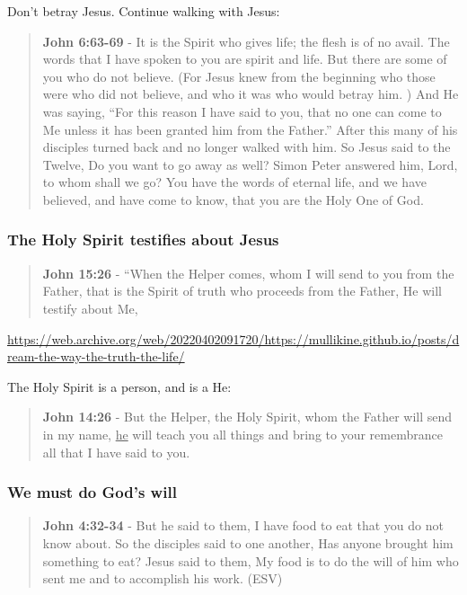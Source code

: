 \documentclass[11pt]{article}
\begin{document}
Don't betray Jesus. Continue walking with Jesus:

\begin{quote}
\textbf{John 6:63-69} - It is the Spirit who gives life; the flesh is of no avail. The words that I have spoken to you are spirit and life. But there are some of you who do not believe. (For Jesus knew from the beginning who those were who did not believe, and who it was who would betray him. ) And He was saying, “For this reason I have said to you, that no one can come to Me unless it has been granted him from the Father.” After this many of his disciples turned back and no longer walked with him. So Jesus said to the Twelve, Do you want to go away as well? Simon Peter answered him, Lord, to whom shall we go? You have the words of eternal life, and we have believed, and have come to know, that you are the Holy One of God.
\end{quote}

\subsubsection{The Holy Spirit testifies about Jesus}
\label{sec:orge667059}
\begin{quote}
\textbf{John 15:26} - “When the Helper comes, whom I will send to you from the Father, that is the Spirit of truth who proceeds from the Father, He will testify about Me,
\end{quote}

\url{https://web.archive.org/web/20220402091720/https://mullikine.github.io/posts/dream-the-way-the-truth-the-life/}

The Holy Spirit is a person, and is a He:

\begin{quote}
\textbf{John 14:26} - But the Helper, the Holy Spirit, whom the Father will send in my name, \uline{he} will teach you all things and bring to your remembrance all that I have said to you.
\end{quote}

\subsubsection{We \textbf{must} do God's will}
\label{sec:org73663e0}

\begin{quote}
\textbf{John 4:32-34} - But he said to them, I have food to eat that you do not know about. So the disciples said to one another, Has anyone brought him something to eat? Jesus said to them, My food is to do the will of him who sent me and to accomplish his work. (ESV)
\end{quote}
\end{document}
